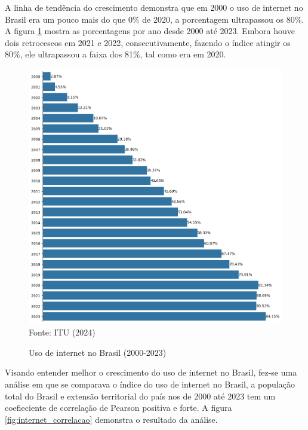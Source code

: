A linha de tendência do crescimento demonstra que em 2000 o uso de internet no Brasil era um pouco mais do que 0\% de 2020, a porcentagem ultrapassou os 80\%. A figura \ref{fig:uso_internet_brasil_itu} mostra as porcentagens por ano desde 2000 até 2023. Embora houve dois retroceseos em 2021 e 2022, consecutivamente, fazendo o índice atingir os 80\%, ele ultrapassou a faixa dos 81\%, tal como era em 2020.

\begin{figure}[ht]
    \centering
    \caption{Uso de internet no Brasil (2000-2023)}
    \includegraphics[width=1\linewidth]{figuras/internet/barplot_uso_internet_brasil_itu.png}
    \label{fig:uso_internet_brasil_itu}
    \footnotesize{Fonte: ITU (2024)}
\end{figure}

Visando entender melhor o crescimento do uso de internet no Brasil, fez-se uma análise em que se comparava o índice do uso de internet no Brasil, a população total do Brasil e extensão territorial do país nos de 2000 até 2023 tem um coefieciente de correlação de Pearson positiva e forte. A figura \ref{fig:internet_correlacao} demonstra o resultado da análise.

